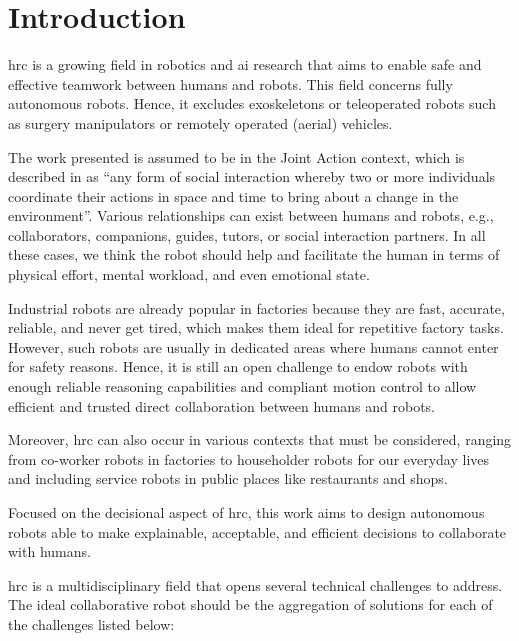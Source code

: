 \chapter*{Introduction}




\minitoc

\acrfull{hrc} is a growing field in robotics and \acrfull{ai} research that aims to enable safe and effective teamwork between humans and robots.
This field concerns fully autonomous robots. Hence, it excludes exoskeletons or teleoperated robots such as surgery manipulators or remotely operated (aerial) vehicles. 

The work presented is assumed to be in the Joint Action context, which is described in \cite{sebanz_joint_2006} as ``any form of social interaction whereby two or more individuals coordinate their actions in space and time to bring about a change in the environment''. Various relationships can exist between humans and robots, e.g., collaborators, companions, guides, tutors, or social interaction partners. In all these cases, we think the robot should help and facilitate the human in terms of physical effort, mental workload, and even emotional state.

Industrial robots are already popular in factories because they are fast, accurate, reliable, and never get tired, which makes them ideal for repetitive factory tasks. 
However, such robots are usually in dedicated areas where humans cannot enter for safety reasons. 
Hence, it is still an open challenge to endow robots with enough reliable reasoning capabilities and compliant motion control to allow efficient and trusted direct collaboration between humans and robots. 

Moreover, \acrshort{hrc} can also occur in various contexts that must be considered, ranging from co-worker robots in factories to householder robots for our everyday lives and including service robots in public places like restaurants and shops.

Focused on the decisional aspect of \acrshort{hrc}, this work aims to design autonomous robots able to make explainable, acceptable, and efficient decisions to collaborate with humans. 

\acrfull{hrc} is a multidisciplinary field that opens several technical challenges to address. The ideal collaborative robot should be the aggregation of solutions for each of the challenges listed below:

